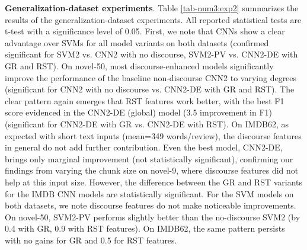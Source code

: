 \noindent
\textbf{Generalization-dataset experiments}.
Table \ref{tab-num3:exp2} summarizes the results of the generalization-dataset experiments. All reported statistical tests are t-test with a significance level of 0.05. First, we note that CNNs show a clear advantage over SVMs for all model variants on both datasets (confirmed significant for SVM2 vs. CNN2 with no discourse, SVM2-PV vs. CNN2-DE with GR and RST).
On novel-50, most discourse-enhanced models significantly improve the performance of the baseline non-discourse CNN2 to varying degrees (significant for CNN2 with no discourse vs. CNN2-DE with GR and RST). 
The clear pattern again emerges that RST features work better, with the best F1 score evidenced in the CNN2-DE (global) model (3.5 improvement in F1) (significant for CNN2-DE with GR vs. CNN2-DE with RST). 
On IMDB62, as expected with short text inputs (mean=349 words/review), the discourse features in general do not add further contribution. Even the best model, CNN2-DE, brings only marginal improvement (not statistically significant), confirming our findings from varying the chunk size on novel-9, where discourse features did not help at this input size. However, the difference between the GR and RST variants for the IMDB CNN models are statistically significant.
For the SVM models on both datasets, we note discourse features do not make noticeable improvements. On novel-50, SVM2-PV performs slightly better than the no-discourse SVM2 (by 0.4 with GR, 0.9 with RST features). On IMDB62, the same pattern persists with no gains for GR and 0.5 for RST features. 

\begin{table}
\begin{center}
\caption{Macro-averaged F1 score for multi-class author classification on the large datasets, using either no discourse (None), grammatical relations (GR), or RST relations (RST).}
\label{tab-num3:exp2}
\vspace{-.5em}
\end{center}
\end{table}

